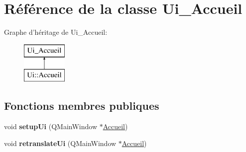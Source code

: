\hypertarget{class_ui___accueil}{\section{Référence de la classe Ui\+\_\+\+Accueil}
\label{class_ui___accueil}
}
Graphe d'héritage de Ui\+\_\+\+Accueil\+:\begin{figure}[H]
\begin{center}
\leavevmode
\includegraphics[height=2.000000cm]{class_ui___accueil}
\end{center}
\end{figure}
\subsection*{Fonctions membres publiques}
\begin{DoxyCompactItemize}
\item 
\hypertarget{class_ui___accueil_a7e4ac5dda22c0ee70dd5bb604335c9b2}{void {\bfseries setup\+Ui} (Q\+Main\+Window $\ast$\hyperlink{class_accueil}{Accueil})}\label{class_ui___accueil_a7e4ac5dda22c0ee70dd5bb604335c9b2}

\item 
\hypertarget{class_ui___accueil_af1be4e1d29cd4656ea9c5cf28eca03a8}{void {\bfseries retranslate\+Ui} (Q\+Main\+Window $\ast$\hyperlink{class_accueil}{Accueil})}\label{class_ui___accueil_af1be4e1d29cd4656ea9c5cf28eca03a8}

\end{DoxyCompactItemize}

